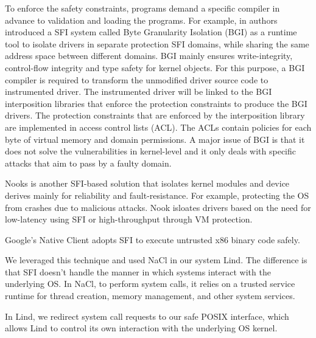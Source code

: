 To enforce the safety constraints, programs demand a specific compiler in advance to validation and loading the programs. For example, in \cite{Castro-BGI} authors introduced a SFI system called Byte Granularity Isolation (BGI) as a runtime tool to isolate drivers in separate protection SFI domains, while sharing the same address space between different domains. BGI mainly ensures write-integrity, control-flow integrity and type safety for kernel objects. For this purpose, a BGI compiler is required to transform the unmodified driver source code to instrumented driver. The instrumented driver will be linked to the BGI interposition libraries that enforce the protection constraints to produce the BGI drivers. The protection constraints that are enforced by the interposition library are implemented in access control lists (ACL). The ACLs contain policies for each byte of virtual memory and domain permissions. A major issue of BGI is that it does not solve the vulnerabilities in kernel-level and it only deals with specific attacks that aim to pass by a faulty domain.


Nooks \cite{Nooks:03} is another SFI-based solution that isolates kernel modules and device derives mainly for reliability and fault-resistance. For example, protecting the OS from crashes due to malicious attacks. Nook isloates drivers based on the need for low-latency using SFI or high-throughput through VM protection. 

Google's Native Client \cite{NaCl-09} adopts SFI to execute untrusted x86 binary code safely. 

We leveraged this technique and used NaCl in our system Lind. The difference is that SFI doesn't handle the manner 
in which systems interact with the underlying OS. In NaCl, to perform system calls, it relies on a trusted service runtime for thread creation, memory management, and other system services. 

In Lind, we redirect system call requests to our safe POSIX interface, 
which allows Lind to control its own interaction with the underlying OS kernel.